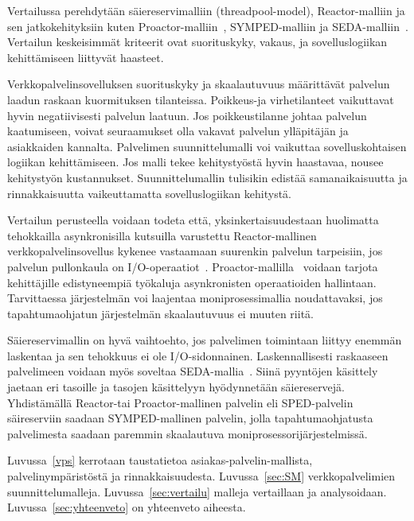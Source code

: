 \documentclass[finnish]{tktltiki2}
\theoremstyle{definition}
\theoremstyle{remark}
\begin{document}
Vertailussa perehdytään säiereservimalliin (threadpool-model), Reactor-malliin\cite{schmidt_reactor:_1995} ja sen jatkokehityksiin
kuten Proactor-malliin~\cite{pyarali_proactor_1997}, SYMPED-malliin ja SEDA-malliin~\cite{welsh_seda_2001}.
Vertailun keskeisimmät kriteerit ovat suorituskyky, vakaus, ja
sovelluslogiikan kehittämiseen liittyvät haasteet.

Verkkopalvelinsovelluksen suorituskyky ja skaalautuvuus
määrittävät palvelun laadun raskaan kuormituksen tilanteissa.
Poikkeus-ja virhetilanteet vaikuttavat hyvin negatiivisesti
palvelun laatuun. Jos poikkeustilanne johtaa
palvelun kaatumiseen, voivat seuraamukset olla vakavat
palvelun ylläpitäjän ja asiakkaiden kannalta.
Palvelimen suunnittelumalli voi vaikuttaa 
sovelluskohtaisen logiikan kehittämiseen.
Jos malli tekee kehitystyöstä hyvin haastavaa,
nousee kehitystyön kustannukset.
Suunnittelumallin tulisikin edistää
samanaikaisuutta ja rinnakkaisuutta vaikeuttamatta
sovelluslogiikan kehitystä.

Vertailun perusteella voidaan todeta että,
yksinkertaisuudestaan huolimatta tehokkailla asynkronisilla
kutsuilla varustettu Reactor-mallinen verkkopalvelinsovellus
kykenee vastaamaan suurenkin palvelun tarpeisiin, jos palvelun
pullonkaula on I/O-operaatiot~\cite{schmidt_reactor:_1995}.
Proactor-mallilla~\cite{pyarali_proactor_1997} voidaan tarjota kehittäjille edistyneempiä työkaluja
asynkronisten operaatioiden hallintaan.
Tarvittaessa järjestelmän voi laajentaa moniprosessimallia noudattavaksi,
jos tapahtumaohjatun järjestelmän skaalautuvuus ei muuten riitä.

Säiereservimallin on hyvä vaihtoehto, jos palvelimen
toimintaan liittyy enemmän laskentaa ja sen tehokkuus ei ole I/O-sidonnainen.
Laskennallisesti raskaaseen palvelimeen voidaan myös soveltaa SEDA-mallia~\cite{welsh_seda_2001}.
Siinä pyyntöjen käsittely jaetaan eri tasoille ja tasojen käsittelyyn
hyödynnetään säiereservejä.
Yhdistämällä Reactor-tai Proactor-mallinen palvelin eli SPED-palvelin säireserviin
saadaan SYMPED-mallinen palvelin, jolla tapahtumaohjatusta palvelimesta
saadaan paremmin skaalautuva moniprosessorijärjestelmissä.


Luvussa~\ref{vps} kerrotaan taustatietoa asiakas-palvelin-mallista, palvelinympäristöstä
ja rinnakkaisuudesta.
Luvussa~\ref{sec:SM} verkkopalvelimien suunnittelumalleja. Luvussa~\ref{sec:vertailu}
malleja vertaillaan ja analysoidaan. Luvussa~\ref{sec:yhteenveto} on yhteenveto aiheesta.
\end{document}
